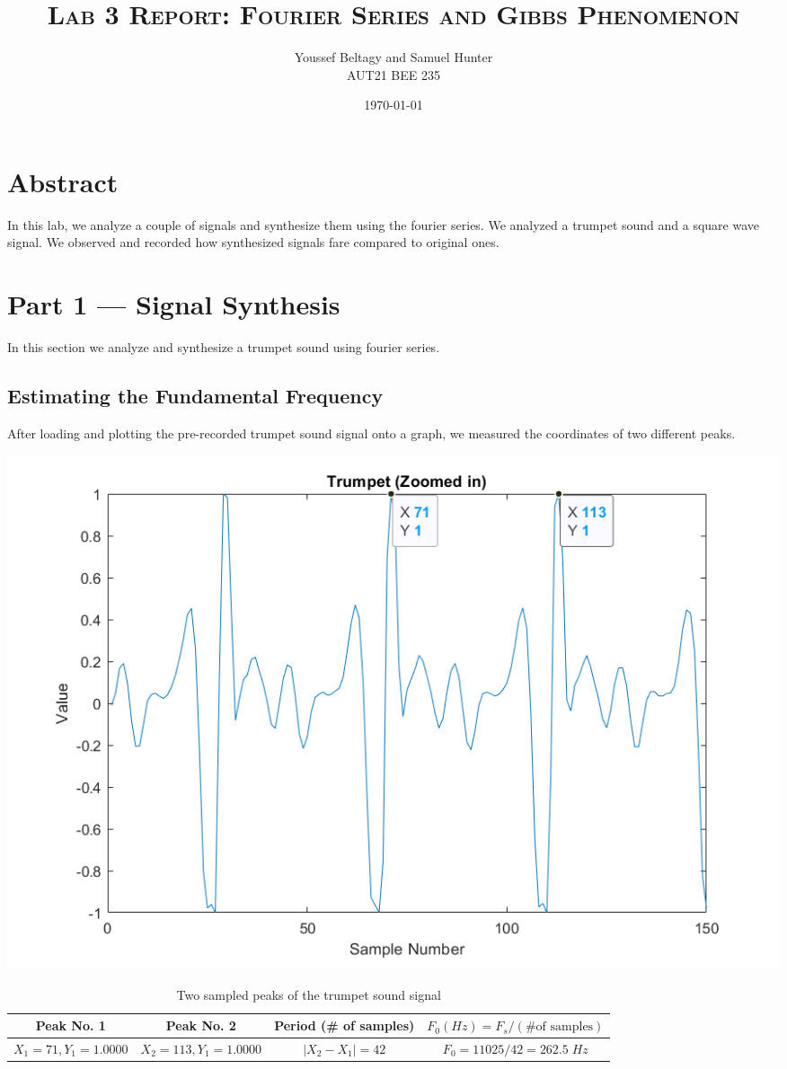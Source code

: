 \documentclass[11pt]{article}
\title{
    \textsc{Lab 3 Report: Fourier Series and Gibbs Phenomenon}
}
\author{
    \Large{Youssef Beltagy and Samuel Hunter} \\
    \large \textsc{AUT21 BEE 235}
}
\date{\today}
\begin{document}
\maketitle %
\pagebreak


\section{Abstract}

In this lab, we analyze a couple of signals and synthesize them using the fourier series.
We analyzed a trumpet sound and a square wave signal.
We observed and recorded how synthesized signals fare compared to original ones.

\section{Part 1 --- Signal Synthesis}

In this section we analyze and synthesize a trumpet sound using fourier series.

\subsection{Estimating the Fundamental Frequency}

After loading and plotting the pre-recorded trumpet sound signal onto a graph, we measured the coordinates of two different peaks.

\includegraphics[width=\textwidth]{trumpet_zoomedin.png}

\begin{table}[H]
	\centering
	\begin{tabular}{cccc}\toprule
		Peak No. 1 & Peak No. 2 & Period (\# of samples) & $F_0 (Hz) = F_s / (\textrm{\# of samples})$ \\\midrule

		$X_1 = 71, Y_1 = 1.0000$ &
		$X_2 = 113, Y_1 = 1.0000$ &
		$|X_2-X_1| = 42$ &
		$F_0 = 11025 / 42 = 262.5\;Hz$ \\\bottomrule
	\end{tabular}
	\caption{\label{tab:two-peaks}Two sampled peaks of the trumpet sound signal}
\end{table}
\end{document}

